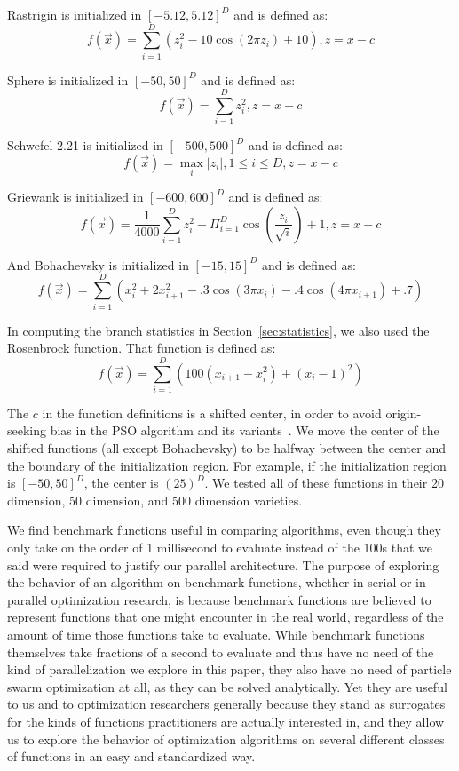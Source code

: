\documentclass[smallcondensed]{svjour3}
\renewcommand{\sec}[1]{Section~\ref{sec:#1}}
\begin{document}
Rastrigin is initialized in $[-5.12,5.12]^D$ and is defined as:
\[f(\Vec{x}) = \sum_{i=1}^D\left(z_i^2 - 10\cos\left(2\pi z_i\right) +
10\right), z=x-c\]

Sphere is initialized in $[-50,50]^D$ and is defined as:
\[f(\Vec{x}) = \sum_{i=1}^D z_i^2, z=x-c\]

Schwefel 2.21 is initialized in $[-500,500]^D$ and is defined as:
\[f(\Vec{x}) = \max_i{|z_i|, 1 \leq i \leq D}, z=x-c\]

Griewank is initialized in $[-600,600]^D$ and is defined as:
\[f(\Vec{x}) = \frac{1}{4000}\sum_{i=1}^D z_i^2 - \Pi_{i=1}^D
\cos\left(\frac{z_i}{\sqrt{i}} \right) + 1, z=x-c\]

And Bohachevsky is initialized in $[-15,15]^D$ and is defined as:
\[f(\Vec{x}) = \sum_{i=1}^D(x_i^2+2x_{i+1}^2-.3\cos(3\pi x_i)-.4\cos(4\pi
x_{i+1})+.7)\]

In computing the branch statistics in \sec{statistics}, we also used the
Rosenbrock function.  That function is defined as:
\[f(\Vec{x}) = \sum_{i=1}^D \left(100(x_{i+1}-x_i^2)+(x_i-1)^2\right)\]

The $c$ in the function definitions is a shifted center, in order to avoid
origin-seeking bias in the PSO algorithm and its
variants~\citep{monson-2005-origin-seeking-bias}.  We move the center of the
shifted functions (all except Bohachevsky) to be halfway between the center and
the boundary of the initialization region.  For example, if the initialization
region is $[-50,50]^D$, the center is $(25)^D$.  We tested all of these
functions in their 20 dimension, 50 dimension, and 500 dimension varieties.

We find benchmark functions useful in comparing algorithms, even though they
only take on the order of 1 millisecond to evaluate instead of the 100s that we
said were required to justify our parallel architecture.  The purpose of
exploring the behavior of an algorithm on benchmark functions, whether in
serial or in parallel optimization research, is because benchmark functions are
believed to represent functions that one might encounter in the real world,
regardless of the amount of time those functions take to evaluate.  While
benchmark functions themselves take fractions of a second to evaluate and thus
have no need of the kind of parallelization we explore in this paper, they also
have no need of particle swarm optimization at all, as they can be solved
analytically.  Yet they are useful to us and to optimization researchers
generally because they stand as surrogates for the kinds of functions
practitioners are actually interested in, and they allow us to explore the
behavior of optimization algorithms on several different classes of functions
in an easy and standardized way.
\end{document}
